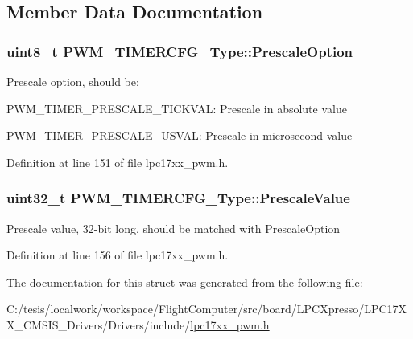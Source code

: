 \subsection{\-Member \-Data \-Documentation}
\hypertarget{struct_p_w_m___t_i_m_e_r_c_f_g___type_ab3b87526b058fcae841151dc3310a7ce}{
\subsubsection[{\-Prescale\-Option}]{\setlength{\rightskip}{0pt plus 5cm}uint8\-\_\-t {\bf \-P\-W\-M\-\_\-\-T\-I\-M\-E\-R\-C\-F\-G\-\_\-\-Type\-::\-Prescale\-Option}}}\label{struct_p_w_m___t_i_m_e_r_c_f_g___type_ab3b87526b058fcae841151dc3310a7ce}
\-Prescale option, should be\-:
\begin{DoxyItemize}
\item \-P\-W\-M\-\_\-\-T\-I\-M\-E\-R\-\_\-\-P\-R\-E\-S\-C\-A\-L\-E\-\_\-\-T\-I\-C\-K\-V\-A\-L\-: \-Prescale in absolute value
\item \-P\-W\-M\-\_\-\-T\-I\-M\-E\-R\-\_\-\-P\-R\-E\-S\-C\-A\-L\-E\-\_\-\-U\-S\-V\-A\-L\-: \-Prescale in microsecond value 
\end{DoxyItemize}

\-Definition at line 151 of file lpc17xx\-\_\-pwm.\-h.

\hypertarget{struct_p_w_m___t_i_m_e_r_c_f_g___type_a8581b0f1aeb123358bf3cfa03d8b60c8}{
\subsubsection[{\-Prescale\-Value}]{\setlength{\rightskip}{0pt plus 5cm}uint32\-\_\-t {\bf \-P\-W\-M\-\_\-\-T\-I\-M\-E\-R\-C\-F\-G\-\_\-\-Type\-::\-Prescale\-Value}}}\label{struct_p_w_m___t_i_m_e_r_c_f_g___type_a8581b0f1aeb123358bf3cfa03d8b60c8}
\-Prescale value, 32-\/bit long, should be matched with \-Prescale\-Option 

\-Definition at line 156 of file lpc17xx\-\_\-pwm.\-h.



\-The documentation for this struct was generated from the following file\-:\begin{DoxyCompactItemize}
\item 
\-C\-:/tesis/localwork/workspace/\-Flight\-Computer/src/board/\-L\-P\-C\-Xpresso/\-L\-P\-C17\-X\-X\-\_\-\-C\-M\-S\-I\-S\-\_\-\-Drivers/\-Drivers/include/\hyperlink{lpc17xx__pwm_8h}{lpc17xx\-\_\-pwm.\-h}\end{DoxyCompactItemize}
